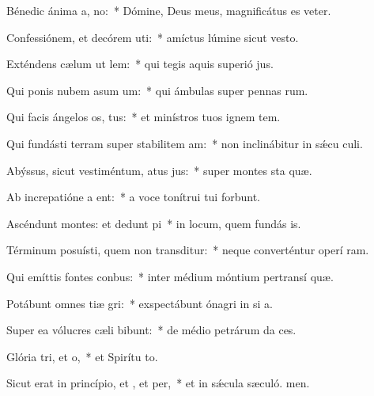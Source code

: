 \item Bénedic ánima a, no:~* Dómine, Deus meus, magnificátus es veter.
\item Confessiónem, et decórem uti:~* amíctus lúmine sicut vesto.
\item Exténdens cælum ut lem:~* qui tegis aquis superió jus.
\item Qui ponis nubem asum um:~* qui ámbulas super pennas rum.
\item Qui facis ángelos os, tus:~* et minístros tuos ignem tem.
\item Qui fundásti terram super stabilitem am:~* non inclinábitur in sǽcu culi.
\item Abýssus, sicut vestiméntum, atus jus:~* super montes sta quæ.
\item Ab increpatióne a ent:~* a voce tonítrui tui forbunt.
\item Ascéndunt montes: et dedunt pi~* in locum, quem fundás is.
\item Términum posuísti, quem non transditur:~* neque converténtur operí ram.
\item Qui emíttis fontes  conbus:~* inter médium móntium pertransí quæ.
\item Potábunt omnes tiæ gri:~* exspectábunt ónagri in si a.
\item Super ea vólucres cæli bibunt:~* de médio petrárum da ces.
\item Glória tri, et o,~* et Spirítu to.
\item Sicut erat in princípio, et , et per,~* et in sǽcula sæculó. men.
